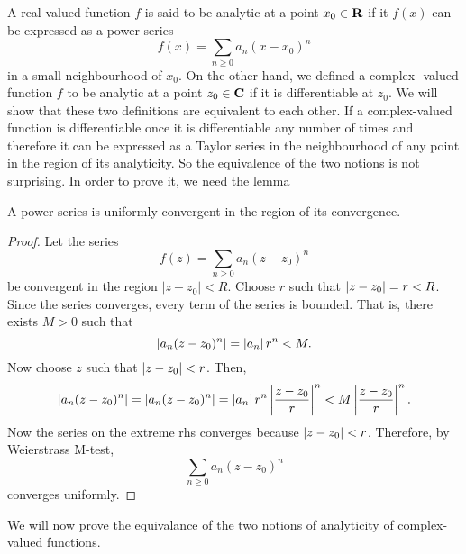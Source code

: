 A real-valued function $f$ is said to be analytic at a point $x_0 \in \mathbf{R}$ if
it $f(x)$ can be expressed as a power series
\[
f(x) = \sum_{n \ge 0}a_n(x - x_0)^n
\]
in a small neighbourhood of $x_0$. On the other hand, we defined a complex-
valued function $f$ to be analytic at a point $z_0 \in \mathbf{C}$ if it is 
differentiable at $z_0$. We will show that these two definitions are 
equivalent to each other. If a complex-valued function is differentiable once
it is differentiable any number of times and therefore it can be expressed
as a Taylor series in the neighbourhood of any point in the region of its
analyticity. So the equivalence of the two notions is not surprising. In order
to prove it, we need the lemma
\begin{lem}\label{c5s1l1}
A power series is uniformly convergent in the region of its convergence.
\end{lem}
\begin{proof}
Let the series 
\[
f(z) = \sum_{n \ge 0} a_n(z - z_0)^n
\]
be convergent in the region $|z - z_0| < R$. Choose $r$ such that $\left\vert{z - 
z_0}\right\vert = r < R$. Since the series converges, every term of the series is bounded.
That is, there exists $M > 0$ such that 
\[
\left\vert{a_n(z - z_0)^n}\right\vert = \left\vert{a_n}\right\vert r^n < M.
\]
Now choose $z$ such that $\left\vert{z - z_0}\right\vert < r$. Then,
\[
\left\vert{a_n (z - z_0)^n}\right\vert = \left\vert{a_n (z - z_0)^n}\right\vert = 
\left\vert{a_n}\right\vert r^n\left\vert{\frac{z - z_0}{r}}\right\vert^n < M\left\vert{\frac{z - z_0}{r}}\right\vert^n.
\]
Now the series on the extreme rhs converges because $\left\vert{z - z_0}\right\vert < r$. 
Therefore, by Weierstrass M-test,
\[
\sum_{n \ge 0} a_n(z -z_0)^n
\]
converges uniformly.
\end{proof}

We will now prove the equivalance of the two notions of analyticity of 
complex-valued functions. 


